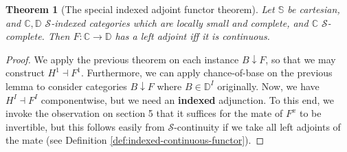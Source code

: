 \documentclass[10pt, oneside]{article}
\newtheorem{theorem}{Theorem}[section]
\begin{document}
\begin{theorem}[The special indexed adjoint functor theorem]
    Let $\mathbb{S}$ be cartesian, and $\mathbb{C}, \mathbb{D}$ $\mathcal{S}$-indexed categories which are locally small and complete, and $\mathbb{C}$ $\mathcal{S}$-complete. Then $F: \mathbb{C} \to \mathbb{D}$ has a left adjoint iff it is continuous.
\end{theorem}
\begin{proof}
    We apply the previous theorem on each instance $B \downarrow F$, so that we may construct $H^1 \dashv F^1$. Furthermore, we can apply chance-of-base on the previous lemma to consider categories $B \downarrow F$ where $B \in \mathbb{D}^I$ originally. Now, we have $H^I \dashv F^I$ componentwise, but we need an \textbf{indexed} adjunction. To this end, we invoke the observation on section 5 that it suffices for the mate of $F^x$ to be invertible, but this follows easily from $\mathcal{S}$-continuity if we take all left adjoints of the mate (see Definition \ref{def:indexed-continuous-functor}).
\end{proof}

\nocite{*}
\printbibliography
\end{document}
